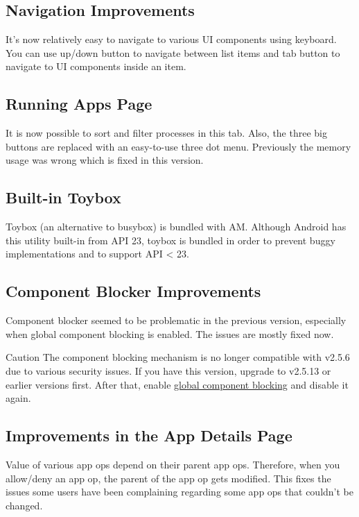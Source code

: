 \subsection{Navigation Improvements}
It's now relatively easy to navigate to various UI components using keyboard. You can use up/down button to navigate
between list items and tab button to navigate to UI components inside an item.

\subsection{Running Apps Page}
It is now possible to sort and filter processes in this tab. Also, the three big buttons are replaced with an
easy-to-use three dot menu. Previously the memory usage was wrong which is fixed in this version.

\subsection{Built-in Toybox}
Toybox (an alternative to busybox) is bundled with AM. Although Android has this utility built-in from API 23, toybox
is bundled in order to prevent buggy implementations and to support API < 23.

\subsection{Component Blocker Improvements}
Component blocker seemed to be problematic in the previous version, especially when global component blocking is enabled.
The issues are mostly fixed now.

\begin{warning}{Caution}
    The component blocking mechanism is no longer compatible with v2.5.6 due to various security issues. If you have
    this version, upgrade to v2.5.13 or earlier versions first. After that, enable
    \hyperref[subsubsec:instant-component-blocking]{global component blocking} and disable it again.
\end{warning}

\subsection{Improvements in the App Details Page}
Value of various app ops depend on their parent app ops. Therefore, when you allow/deny an app op, the parent of the app
op gets modified. This fixes the issues some users have been complaining regarding some app ops that couldn't be changed.

